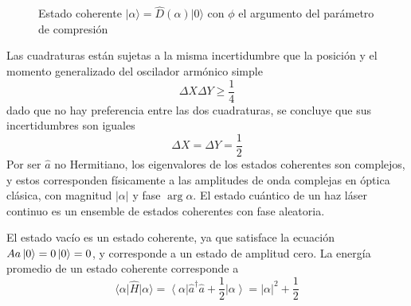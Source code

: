 \begin{figure}[!h]
\begin{tikzpicture}[x=0.75pt,y=0.75pt,yscale=-1,xscale=1]
  \end{tikzpicture}

  \caption{Estado coherente $\vert \alpha \rangle = \hat{D}(\alpha)\vert 0 \rangle$ con $\phi$ el argumento del parámetro de compresión}
  \label{fig:displaced-vacuum}
\end{figure}


Las cuadraturas están sujetas a la misma incertidumbre que la posición y el momento generalizado del oscilador armónico simple
\begin{equation*}
  \Delta X \Delta Y \geq \frac{1}{4}
\end{equation*}
dado que no hay preferencia entre las dos cuadraturas, se concluye que sus incertidumbres son iguales
\begin{equation*}
  \Delta X = \Delta Y = \frac{1}{2}
\end{equation*}
Por ser $\hat{a}$ no Hermitiano, los eigenvalores de los estados coherentes son complejos, y estos corresponden físicamente a las amplitudes de onda complejas en óptica clásica, con magnitud $|\alpha|$ y fase $\arg \alpha$. El estado cuántico de un haz láser continuo es un ensemble de estados coherentes con fase aleatoria.

El estado vacío es un estado coherente, ya que satisface la ecuación $\hat{a} \ket{0} = 0 \ket{0} = 0$, y corresponde a un estado de amplitud cero. La energía promedio de un estado coherente corresponde a
\begin{equation*}
  \langle \alpha \vert \hat{H}\vert \alpha \rangle = \left\langle \alpha \right\vert \hat{a}^{\dagger}\hat{a} + \frac{1}{2} \left\vert \alpha \right\rangle = |\alpha|^2 + \frac{1}{2}
\end{equation*}

